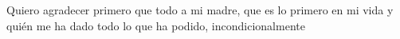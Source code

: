 \begin{acknowledgements}
    Quiero agradecer primero que todo a mi madre, que es lo primero en mi vida y quién me ha dado todo lo que ha podido,
    incondicionalmente
\end{acknowledgements}